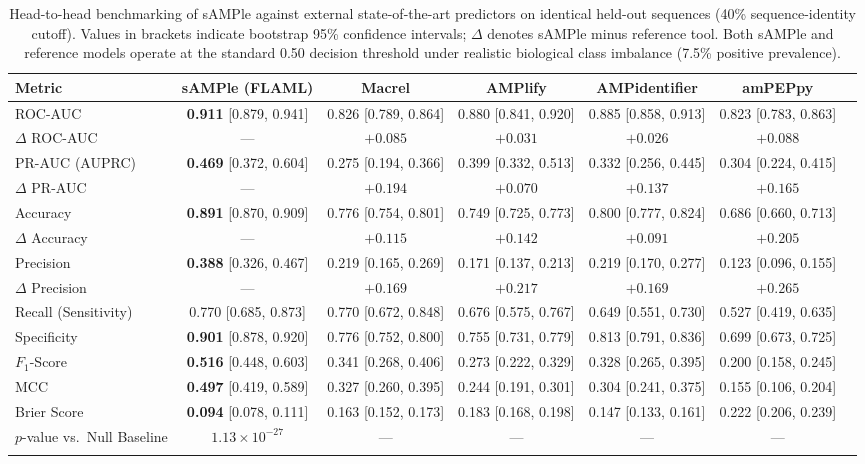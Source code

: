 \documentclass[unnumsec,webpdf,contemporary,large]{oup-authoring-template}%
\begin{document}
\begin{table}[!t]
\caption{Head-to-head benchmarking of sAMPle against external state-of-the-art predictors on identical held-out sequences (40\% sequence-identity cutoff). Values in brackets indicate bootstrap 95\% confidence intervals; $\Delta$ denotes sAMPle minus reference tool. Both sAMPle and reference models operate at the standard 0.50 decision threshold under realistic biological class imbalance (7.5\% positive prevalence).}\label{tab:benchmarks}
\begin{center}
\begin{tabular*}{\textwidth}{@{\extracolsep\fill}lcccccc@{\extracolsep\fill}}
\toprule
Metric & sAMPle (FLAML) & Macrel & AMPlify & AMPidentifier & amPEPpy \\
\midrule
ROC-AUC & \textbf{0.911} [0.879, 0.941] & 0.826 [0.789, 0.864] & 0.880 [0.841, 0.920] & 0.885 [0.858, 0.913] & 0.823 [0.783, 0.863] \\
$\Delta$ ROC-AUC & --- & $+0.085$ & $+0.031$ & $+0.026$ & $+0.088$ \\
\midrule
PR-AUC (AUPRC) & \textbf{0.469} [0.372, 0.604] & 0.275 [0.194, 0.366] & 0.399 [0.332, 0.513] & 0.332 [0.256, 0.445] & 0.304 [0.224, 0.415] \\
$\Delta$ PR-AUC & --- & $+0.194$ & $+0.070$ & $+0.137$ & $+0.165$ \\
\midrule
Accuracy & \textbf{0.891} [0.870, 0.909] & 0.776 [0.754, 0.801] & 0.749 [0.725, 0.773] & 0.800 [0.777, 0.824] & 0.686 [0.660, 0.713] \\
$\Delta$ Accuracy & --- & $+0.115$ & $+0.142$ & $+0.091$ & $+0.205$ \\
\midrule
Precision & \textbf{0.388} [0.326, 0.467] & 0.219 [0.165, 0.269] & 0.171 [0.137, 0.213] & 0.219 [0.170, 0.277] & 0.123 [0.096, 0.155] \\
$\Delta$ Precision & --- & $+0.169$ & $+0.217$ & $+0.169$ & $+0.265$ \\
\midrule
Recall (Sensitivity) & 0.770 [0.685, 0.873] & 0.770 [0.672, 0.848] & 0.676 [0.575, 0.767] & 0.649 [0.551, 0.730] & 0.527 [0.419, 0.635] \\
Specificity & \textbf{0.901} [0.878, 0.920] & 0.776 [0.752, 0.800] & 0.755 [0.731, 0.779] & 0.813 [0.791, 0.836] & 0.699 [0.673, 0.725] \\
$F_1$-Score & \textbf{0.516} [0.448, 0.603] & 0.341 [0.268, 0.406] & 0.273 [0.222, 0.329] & 0.328 [0.265, 0.395] & 0.200 [0.158, 0.245] \\
MCC & \textbf{0.497} [0.419, 0.589] & 0.327 [0.260, 0.395] & 0.244 [0.191, 0.301] & 0.304 [0.241, 0.375] & 0.155 [0.106, 0.204] \\
Brier Score & \textbf{0.094} [0.078, 0.111] & 0.163 [0.152, 0.173] & 0.183 [0.168, 0.198] & 0.147 [0.133, 0.161] & 0.222 [0.206, 0.239] \\
$p$-value vs.\ Null Baseline & $1.13 \times 10^{-27}$ & --- & --- & --- & --- \\
\botrule
\end{tabular*}
\end{center}
\end{table}
\end{document}
